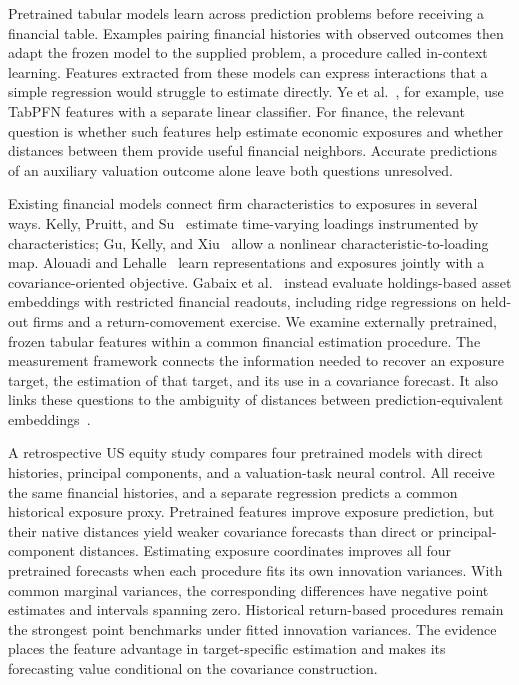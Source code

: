 \documentclass[11pt]{article}
\begin{document}
Pretrained tabular models learn across prediction problems before receiving a
financial table. Examples pairing financial histories with observed outcomes
then adapt the frozen model to the supplied problem, a procedure called
in-context learning. Features extracted from these models can express
interactions that a simple regression would struggle to estimate directly.
Ye et al.~\cite{ye}, for example, use TabPFN features with a separate linear
classifier. For finance, the relevant question is whether such features help
estimate economic exposures and whether distances between them provide useful
financial neighbors. Accurate predictions of an auxiliary valuation outcome
alone leave both questions unresolved.

Existing financial models connect firm characteristics to exposures in several
ways. Kelly, Pruitt, and Su~\cite{kps} estimate time-varying loadings
instrumented
by characteristics; Gu, Kelly, and Xiu~\cite{gkx} allow a nonlinear
characteristic-to-loading map. Alouadi and Lehalle~\cite{alouadi} learn
representations and exposures jointly with a covariance-oriented objective.
Gabaix et al.~\cite{assetembeddings} instead evaluate holdings-based asset
embeddings with restricted financial readouts, including ridge regressions on
held-out firms and a return-comovement exercise. We examine externally
pretrained, frozen tabular features within a common financial estimation
procedure. The measurement framework connects the information needed to recover
an exposure target, the estimation of that target, and its use in a covariance
forecast. It also links these questions to the ambiguity of distances between
prediction-equivalent embeddings~\cite{steck}.

A retrospective US equity study compares four pretrained models with direct
histories, principal components, and a valuation-task neural control.
All receive
the same financial histories, and a separate regression predicts a common
historical exposure proxy. Pretrained features improve exposure prediction, but
their native distances yield weaker covariance forecasts than direct or
principal-component distances. Estimating exposure coordinates improves all four
pretrained forecasts when each procedure fits its own innovation variances.
With common marginal variances, the corresponding differences have negative
point estimates and intervals spanning zero. Historical return-based procedures
remain the strongest point benchmarks under fitted innovation
variances. The evidence places the feature
advantage in target-specific estimation and makes its forecasting value
conditional on the covariance construction.
\end{document}
